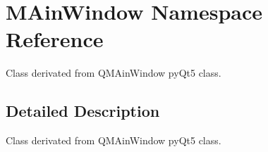 \hypertarget{namespaceMAinWindow}{}\section{M\+Ain\+Window Namespace Reference}
\label{namespaceMAinWindow}


Class derivated from Q\+M\+Ain\+Window py\+Qt5 class.  




\subsection{Detailed Description}
Class derivated from Q\+M\+Ain\+Window py\+Qt5 class. 